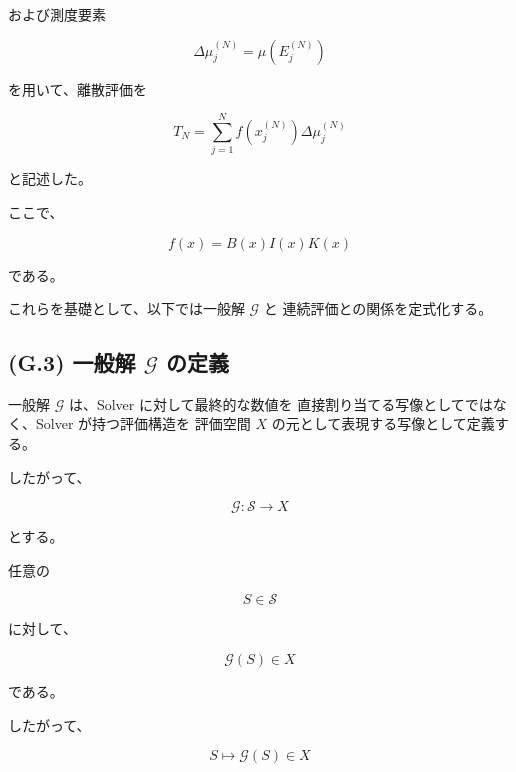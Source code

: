 \documentclass[a4paper,11pt]{article}
\begin{document}
および測度要素

\begin{equation}
    \Delta\mu_j^{(N)}
    =
    \mu\!\left(E_j^{(N)}\right)
\end{equation}

を用いて、離散評価を

\begin{equation}
    T_N
    =
    \sum_{j=1}^{N}
    f\!\left(x_j^{(N)}\right)
    \Delta\mu_j^{(N)}
\end{equation}

と記述した。

ここで、

\begin{equation}
    f(x)
    =
    B(x)I(x)K(x)
\end{equation}

である。

これらを基礎として、以下では一般解 $\mathcal{G}$ と
連続評価との関係を定式化する。


\subsection{(G.3) 一般解 $\mathcal{G}$ の定義}
\label{subsec:G3}

一般解 $\mathcal{G}$ は、Solver に対して最終的な数値を
直接割り当てる写像としてではなく、Solver が持つ評価構造を
評価空間 $X$ の元として表現する写像として定義する。

したがって、

\begin{equation}
    \boxed{
        \mathcal{G}:
        \mathcal{S}
        \longrightarrow
        X
    }
    \label{eq:G-general-solution}
\end{equation}

とする。

任意の

\begin{equation}
    S\in\mathcal{S}
\end{equation}

に対して、

\begin{equation}
    \mathcal{G}(S)\in X
\end{equation}

である。

したがって、

\begin{equation}
    \boxed{
        S
        \longmapsto
        \mathcal{G}(S)\in X
    }
\end{equation}
\end{document}
